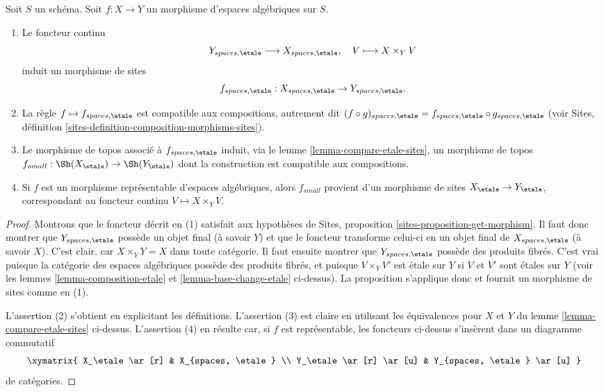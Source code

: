 \begin{lemma}
\label{lemma-functoriality-etale-site}
Soit $S$ un schéma.
Soit $f : X \to Y$ un morphisme d'espaces algébriques sur $S$.
\begin{enumerate}
\item Le foncteur continu
$$
Y_{spaces, \etale} \longrightarrow X_{spaces, \etale}, \quad
V \longmapsto X \times_Y V
$$
induit un morphisme de sites
$$
f_{spaces, \etale} :
X_{spaces, \etale}
\to
Y_{spaces, \etale}.
$$
\item La règle $f \mapsto f_{spaces, \etale}$ est compatible aux
compositions, autrement dit $(f \circ g)_{spaces, \etale}
= f_{spaces, \etale} \circ g_{spaces, \etale}$ (voir
Sites, définition \ref{sites-definition-composition-morphisms-sites}).
\item Le morphisme de topos associé à $f_{spaces, \etale}$
induit, via le lemme \ref{lemma-compare-etale-sites}, un morphisme de topos
$f_{small} : \Sh(X_\etale) \to \Sh(Y_\etale)$
dont la construction est compatible aux compositions.
\item Si $f$ est un morphisme représentable d'espaces algébriques,
alors $f_{small}$ provient d'un morphisme de sites
$X_\etale \to Y_\etale$,
correspondant au foncteur continu $V \mapsto X \times_Y V$.
\end{enumerate}
\end{lemma}

\begin{proof}
Montrons que le foncteur décrit en (1) satisfait aux hypothèses
de Sites, proposition \ref{sites-proposition-get-morphism}.
Il faut donc montrer que
$Y_{spaces, \etale}$ possède un objet final (à savoir $Y$) et que
le foncteur transforme celui-ci en un objet final de $X_{spaces, \etale}$
(à savoir $X$). C'est clair, car $X \times_Y Y = X$ dans toute catégorie.
Il faut ensuite montrer que $Y_{spaces, \etale}$ possède des produits fibrés.
C'est vrai puisque la catégorie des espaces algébriques possède des produits fibrés,
et puisque $V \times_Y V'$ est \'etale sur $Y$ si $V$ et $V'$ sont \'etales
sur $Y$ (voir les lemmes \ref{lemma-composition-etale} et
\ref{lemma-base-change-etale} ci-dessus).
La proposition s'applique donc et fournit un morphisme
de sites comme en (1).

\medskip\noindent
L'assertion (2) s'obtient en explicitant les définitions.
L'assertion (3) est claire en utilisant les équivalences pour $X$ et $Y$
du lemme \ref{lemma-compare-etale-sites} ci-dessus.
L'assertion (4) en résulte car, si $f$ est représentable, les
foncteurs ci-dessus s'insèrent dans un diagramme commutatif
$$
\xymatrix{
X_\etale \ar[r] &
X_{spaces, \etale} \\
Y_\etale \ar[r] \ar[u] &
Y_{spaces, \etale} \ar[u]
}
$$
de catégories.
\end{proof}

